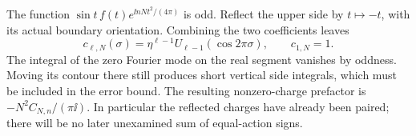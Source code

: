 The function \(\sin t\,f(t)e^{\ii nNt^2/(4\pi)}\) is odd.
Reflect the upper side by \(t\mapsto-t\), with its actual
boundary orientation. Combining the two coefficients leaves
\begin{equation}\label{dt:eq-39}
 c_{\ell,N}(\sigma)=
   \eta^{\ell-1}U_{\ell-1}(\cos2\pi\sigma),\qquad c_{1,N}=1.
\end{equation}
The integral of the zero Fourier mode on the real segment vanishes
by oddness. Moving its contour there still produces short vertical
side integrals, which must be included in the error bound. The resulting
nonzero-charge prefactor is \(-N^2C_{N,n}/(\pi\ii)\).
In particular the reflected charges have already been paired;
there will be no later unexamined sum of equal-action signs.

